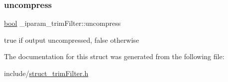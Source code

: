 \subsubsection{\texorpdfstring{uncompress}{uncompress}}
{\footnotesize\ttfamily \mbox{\hyperlink{defines_8h_abb452686968e48b67397da5f97445f5b}{bool}} \+\_\+iparam\+\_\+trim\+Filter\+::uncompress}

true if output uncompressed, false otherwise 

The documentation for this struct was generated from the following file\+:\begin{DoxyCompactItemize}
\item 
include/\mbox{\hyperlink{struct__trimFilter_8h}{struct\+\_\+trim\+Filter.\+h}}\end{DoxyCompactItemize}

